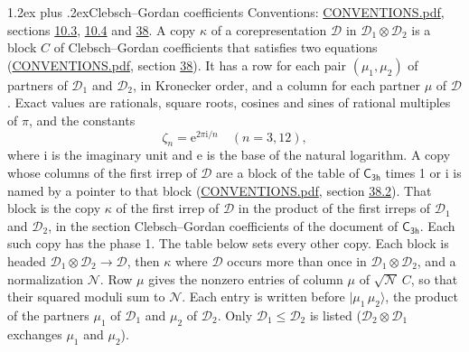 \documentclass[10pt,a4paper]{article}
\makeatletter
\renewcommand\section{\@startsection{section}{1}{\z@}{-3ex plus -1ex minus -.2ex}%
  {1.2ex plus .2ex}{\normalfont\large\sffamily\bfseries\color{parttitle}}}
\numberwithin{equation}{section}
\newcommand{\grp}[1]{\mathsf{#1}}
\newcommand{\iunit}{\mathrm{i}}
\newcommand{\expe}{\mathrm{e}}
\newcommand{\rootunity}[1]{\zeta_{#1}}
\newcommand{\irrprod}{\otimes}
\newcommand{\mult}{\kappa}
\newcommand{\intx}{\mu}
\newcommand{\cgnorm}{\mathcal{N}}
\newcommand{\prodket}[2]{\lvert {#1}\,{#2}\rangle}
\makeatother
\begin{document}
\section{Clebsch--Gordan coefficients}\label{s:clebsch_gordan}
Conventions: \href{../../CONVENTIONS.pdf}{CONVENTIONS.pdf}, sections \href{../../../rotation/CONVENTIONS.pdf\#conv.10.3}{10.3}, \href{../../../rotation/CONVENTIONS.pdf\#conv.10.4}{10.4} and \href{../../CONVENTIONS.pdf\#conv.38}{38}.
\leavevmode\label{n:index.copy}\label{n:matrix.cg.stored}A copy $\mult$ of a corepresentation $\mathcal{D}$ in $\mathcal{D}_1\irrprod\mathcal{D}_2$ is a block $C$ of Clebsch--Gordan coefficients that satisfies two equations (\href{../../CONVENTIONS.pdf}{CONVENTIONS.pdf}, section \href{../../CONVENTIONS.pdf\#conv.38}{38}). \label{n:index.cg}It has a row for each pair $(\intx_1, \intx_2)$ of partners of $\mathcal{D}_1$ and $\mathcal{D}_2$, in Kronecker order, and a column for each partner $\intx$ of $\mathcal{D}$.
\leavevmode\label{n:constant.root}\label{n:index.root.order}Exact values are rationals, square roots, cosines and sines of rational multiples of $\pi$, and the constants
\begin{equation}\label{e:constants}\rootunity{n} = \expe^{2\pi\iunit/n}\quad(n = 3, 12),\end{equation}
where $\iunit$ is the imaginary unit and $\expe$ is the base of the natural logarithm.
A copy whose columns of the first irrep of $\mathcal{D}$ are a block of the table of $\grp{C_{3h}}$ times 1 or $\iunit$ is named by a pointer to that block (\href{../../CONVENTIONS.pdf}{CONVENTIONS.pdf}, section \href{../../CONVENTIONS.pdf\#conv.38.2}{38.2}). That block is the copy $\mult$ of the first irrep of $\mathcal{D}$ in the product of the first irreps of $\mathcal{D}_1$ and $\mathcal{D}_2$, in the section Clebsch--Gordan coefficients of the document of \href{../../../rotation/data/pdf/C3h.pdf}{$\grp{C_{3h}}$}. Each such copy has the phase 1. The table below sets every other copy.
Each block is headed $\mathcal{D}_1\irrprod\mathcal{D}_2\to\mathcal{D}$, then $\mult$ where $\mathcal{D}$ occurs more than once in $\mathcal{D}_1\irrprod\mathcal{D}_2$, and a normalization $\cgnorm$. Row $\intx$ gives the nonzero entries of column $\intx$ of $\sqrt{\cgnorm}\,C$, so that their squared moduli sum to $\cgnorm$. \label{n:vector.ket.product}Each entry is written before $\prodket{\intx_1}{\intx_2}$, the product of the partners $\intx_1$ of $\mathcal{D}_1$ and $\intx_2$ of $\mathcal{D}_2$. Only $\mathcal{D}_1 \le \mathcal{D}_2$ is listed ($\mathcal{D}_2\irrprod\mathcal{D}_1$ exchanges $\intx_1$ and $\intx_2$).
\end{document}
